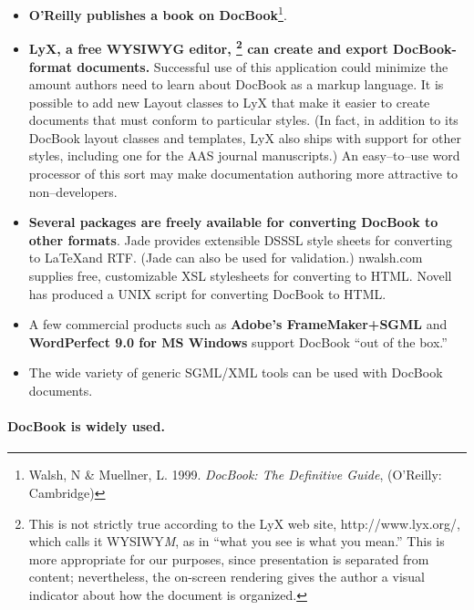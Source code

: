 \begin{itemize}
\item {\bf O'Reilly publishes a book on DocBook}\footnote{Walsh, N \&
Muellner, L. 1999. {\it DocBook: The Definitive Guide}, (O'Reilly:
Cambridge)}. 
\item {\bf LyX, a free WYSIWYG editor,%
%
\footnote{This is not strictly true
according to the LyX web site, %
{http://www.lyx.org/}, which calls it WYSIWY{\it M}, as in ``what you
see is what you mean.''  This is more appropriate for our purposes,
since presentation is separated from content; nevertheless,
the on-screen rendering gives the author a visual indicator about how
the document is organized.}
%
can create and export DocBook-format documents.}  Successful use of
this application could minimize the amount authors need to learn about
DocBook as a markup language.  It is possible to add new Layout
classes to LyX that make it easier to create documents that must
conform to particular styles.  (In fact, in addition to its DocBook
layout classes and templates, LyX also ships with support for other
styles, including one for the AAS journal manuscripts.)  An
easy--to--use word processor of this sort may make documentation
authoring more attractive to non--developers.

\item {\bf Several packages are freely available for converting
DocBook to other formats}.  Jade provides extensible DSSSL style
sheets for converting to \LaTeX and RTF. (Jade can also be used for
validation.)  nwalsh.com supplies free,
customizable XSL stylesheets for converting to HTML.  Novell has 
produced a UNIX script for converting DocBook to HTML.  

\item A few commercial products such as {\bf Adobe's FrameMaker+SGML}
and {\bf WordPerfect 9.0 for MS Windows} support DocBook ``out of the
box.'' 

\item The wide variety of generic SGML/XML tools can be used with
DocBook documents.
\end{itemize}

\paragraph{DocBook is widely used.}

